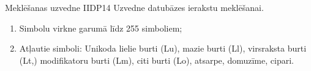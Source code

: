 \parameterTable
{Meklēšanas uzvedne}
{IIDP14}
{
	Uzvedne datubāzes ierakstu meklēšanai.
}
{
	\begin{enumerate}
		\item Simbolu virkne garumā līdz 255 simboliem;
		\item Atļautie simboli: Unikoda lielie burti (Lu), mazie burti (Ll), virsraksta burti (Lt,) modifikatoru burti (Lm), citi burti (Lo), atsarpe, domuzīme, cipari.
	\end{enumerate}
}
{
}
